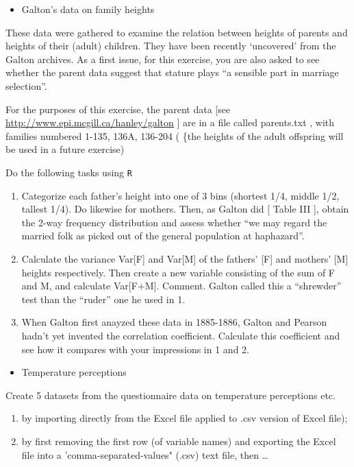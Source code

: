 \documentclass[]{book}
\providecommand{\tightlist}{%
  \setlength{\itemsep}{0pt}\setlength{\parskip}{0pt}}
\begin{document}
\begin{itemize}
\tightlist
\item
  Galton's data on family heights
\end{itemize}

These data were gathered to examine the relation between heights of parents and heights of their (adult) children. They have been recently `uncovered' from the Galton archives. As a first issue, for this exercise, you are also asked to see whether the parent data suggest that stature plays ``a sensible part in marriage selection''.

For the purposes of this exercise, the parent data {[}see \url{http://www.epi.mcgill.ca/hanley/galton} {]} are in a file called parents.txt , with families numbered 1-135, 136A, 136-204 ( \{the heights of the adult offspring will be used in a future exercise)

Do the following tasks using \texttt{R}

\begin{enumerate}
\def\labelenumi{\arabic{enumi}.}
\item
  Categorize each father's height into one of 3 bins (shortest 1/4, middle 1/2, tallest 1/4). Do likewise for mothers. Then, as Galton did {[} Table III {]}, obtain the 2-way frequency distribution and assess whether ``we may regard the married folk as picked out of the general population at haphazard''.
\item
  Calculate the variance Var{[}F{]} and Var{[}M{]} of the fathers' {[}F{]} and mothers' {[}M{]} heights respectively. Then create a new variable consisting of the sum of F and M, and calculate Var{[}F+M{]}. Comment. Galton called this a ``shrewder'' test than the ``ruder'' one he used in 1.
\item
  When Galton first anayzed these data in 1885-1886, Galton and Pearson hadn't yet invented the correlation coefficient. Calculate this coefficient and see how it compares with your impressions in 1 and 2.
\end{enumerate}

\begin{itemize}
\tightlist
\item
  Temperature perceptions
\end{itemize}

Create 5 datasets from the questionnaire data on temperature perceptions etc.

\begin{enumerate}
\def\labelenumi{(\roman{enumi})}
\item
  by importing directly from the Excel file applied to .csv version of Excel file);
\item
  by first removing the first row (of variable names) and exporting the Excel file into a 'comma-separated-values" (.csv) text file, then \ldots{}
\end{enumerate}
\end{document}
